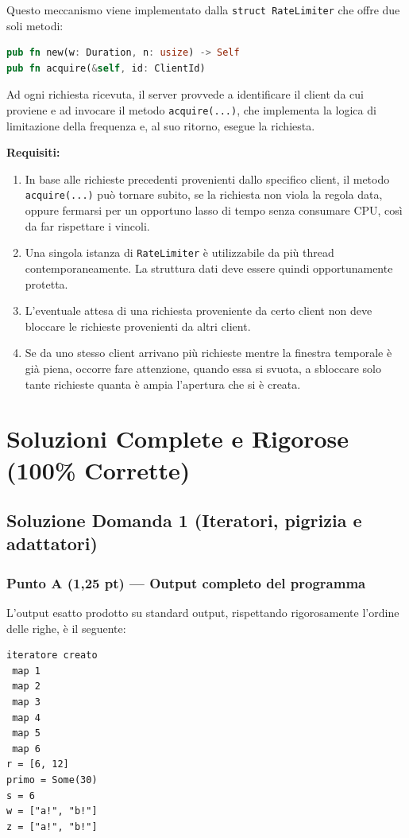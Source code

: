 \documentclass[11pt,a4paper]{article}
\begin{document}
Questo meccanismo viene implementato dalla \texttt{struct RateLimiter} che offre due soli metodi:
\begin{lstlisting}[language=Rust]
pub fn new(w: Duration, n: usize) -> Self
pub fn acquire(&self, id: ClientId)
\end{lstlisting}
Ad ogni richiesta ricevuta, il server provvede a identificare il client da cui proviene e ad invocare il metodo \texttt{acquire(...)}, che implementa la logica di limitazione della frequenza e, al suo ritorno, esegue la richiesta.

\textbf{Requisiti:}
\begin{enumerate}[leftmargin=1.5em]
    \item In base alle richieste precedenti provenienti dallo specifico client, il metodo \texttt{acquire(...)} può tornare subito, se la richiesta non viola la regola data, oppure fermarsi per un opportuno lasso di tempo senza consumare CPU, così da far rispettare i vincoli.
    \item Una singola istanza di \texttt{RateLimiter} è utilizzabile da più thread contemporaneamente. La struttura dati deve essere quindi opportunamente protetta.
    \item L'eventuale attesa di una richiesta proveniente da certo client non deve bloccare le richieste provenienti da altri client.
    \item Se da uno stesso client arrivano più richieste mentre la finestra temporale è già piena, occorre fare attenzione, quando essa si svuota, a sbloccare solo tante richieste quanta è ampia l'apertura che si è creata.
\end{enumerate}

\newpage
\section{Soluzioni Complete e Rigorose (100\% Corrette)}

\subsection{Soluzione Domanda 1 (Iteratori, pigrizia e adattatori)}

\subsubsection*{Punto A (1,25 pt) --- Output completo del programma}
L'output esatto prodotto su standard output, rispettando rigorosamente l'ordine delle righe, è il seguente:
\begin{lstlisting}[style=terminal]
iteratore creato
 map 1
 map 2
 map 3
 map 4
 map 5
 map 6
r = [6, 12]
primo = Some(30)
s = 6
w = ["a!", "b!"]
z = ["a!", "b!"]
\end{lstlisting}
\end{document}
